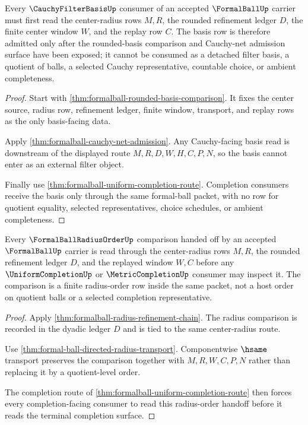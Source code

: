 \begin{theorem}
\label{thm:formalball-filter-basis-route}
Every $\CauchyFilterBasisUp$ consumer of an accepted $\FormalBallUp$ carrier must first read the center-radius rows $M,R$, the rounded refinement ledger $D$, the finite center window $W$, and the replay row $C$. The basis row is therefore admitted only after the rounded-basis comparison and Cauchy-net admission surface have been exposed; it cannot be consumed as a detached filter basis, a quotient of balls, a selected Cauchy representative, countable choice, or ambient completeness.
\end{theorem}
\begin{proof}
Start with \autoref{thm:formalball-rounded-basis-comparison}. It fixes the center source, radius row, refinement ledger, finite window, transport, and replay rows as the only basis-facing data.

Apply \autoref{thm:formalball-cauchy-net-admission}. Any Cauchy-facing basis read is downstream of the displayed route $M,R,D,W,H,C,P,N$, so the basis cannot enter as an external filter object.

Finally use \autoref{thm:formalball-uniform-completion-route}. Completion consumers receive the basis only through the same formal-ball packet, with no row for quotient equality, selected representatives, choice schedules, or ambient completeness.
\end{proof}

\begin{theorem}
\label{thm:formalball-radius-order-handoff}
Every $\FormalBallRadiusOrderUp$ comparison handed off by an accepted $\FormalBallUp$ carrier is read through the center-radius rows $M,R$, the rounded refinement ledger $D$, and the replayed window $W,C$ before any $\UniformCompletionUp$ or $\MetricCompletionUp$ consumer may inspect it. The comparison is a finite radius-order row inside the same packet, not a host order on quotient balls or a selected completion representative.
\end{theorem}
\begin{proof}
Apply \autoref{thm:formalball-radius-refinement-chain}. The radius comparison is recorded in the dyadic ledger $D$ and is tied to the same center-radius route.

Use \autoref{thm:formal-ball-directed-radius-transport}. Componentwise $\hsame$ transport preserves the comparison together with $M,R,W,C,P,N$ rather than replacing it by a quotient-level order.

The completion route of \autoref{thm:formalball-uniform-completion-route} then forces every completion-facing consumer to read this radius-order handoff before it reads the terminal completion surface.
\end{proof}

